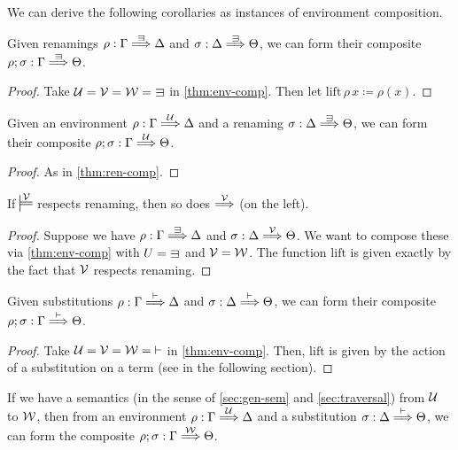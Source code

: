 We can derive the following corollaries as instances of environment composition.

\begin{corollary}\label{thm:ren-comp}
  Given renamings $\rho : \Gamma \env\sqni \Delta$ and
  $\sigma : \Delta \env\sqni \Theta$, we can form their composite
  $\rho; \sigma : \Gamma \env\sqni \Theta$.
\end{corollary}
\begin{proof}
  Take $\U = \V = \W = {\sqni}$ in \cref{thm:env-comp}.
  Then let $\mathrm{lift}\,\rho\,x \coloneqq \rho(x)$.
\end{proof}

\begin{corollary}\label{thm:ren-env-comp}
  Given an environment $\rho : \Gamma \stackrel{\mathcal U}\Longrightarrow \Delta$ and a renaming
  $\sigma : \Delta \env\sqni \Theta$, we can form their composite
  $\rho; \sigma : \Gamma \stackrel{\mathcal U}\Longrightarrow \Theta$.
\end{corollary}
\begin{proof}
  As in \cref{thm:ren-comp}.
\end{proof}

\begin{corollary}\label{thm:env-ren}
  If $\sdtstile{}\V$ respects renaming, then so does $\stackrel{\mathcal V}\Longrightarrow$ (on the left).
\end{corollary}
\begin{proof}
  Suppose we have $\rho : \Gamma \env\sqni \Delta$ and
  $\sigma : \Delta \stackrel{\mathcal V}\Longrightarrow \Theta$.
  We want to compose these via \cref{thm:env-comp} with $U = {\sqni}$ and
  $\mathcal V = \mathcal W$.
  The function $\mathrm{lift}$ is given exactly by the fact that $\mathcal V$ respects
  renaming.
\end{proof}

\begin{corollary}\label{thm:sub-comp}
  Given substitutions $\rho : \Gamma \stackrel{\vdash}\Longrightarrow \Delta$ and
  $\sigma : \Delta \stackrel{\vdash}\Longrightarrow \Theta$, we can form their composite
  $\rho; \sigma : \Gamma \stackrel{\vdash}\Longrightarrow \Theta$.
\end{corollary}
\begin{proof}
  Take $\mathcal U = \mathcal V = \mathcal W = {\vdash}$ in \cref{thm:env-comp}.
  Then, $\mathrm{lift}$ is given by the action of a substitution on a term
  (see  in the following section).
\end{proof}

\begin{corollary}
  If we have a semantics (in the sense of \cref{sec:gen-sem} and
  \cref{sec:traversal}) from $\mathcal U$ to $\mathcal W$, then from an environment
  $\rho : \Gamma \stackrel{\mathcal U}\Longrightarrow \Delta$ and a substitution
  $\sigma : \Delta \stackrel{\vdash}\Longrightarrow \Theta$, we can form the composite
  $\rho; \sigma : \Gamma \stackrel{\mathcal W}\Longrightarrow \Theta$.
\end{corollary}

